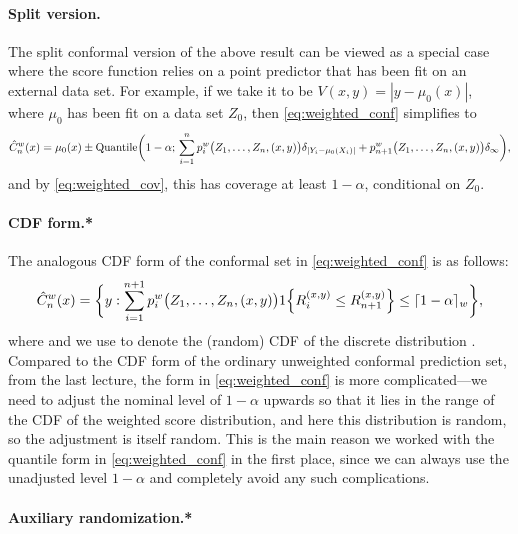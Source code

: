 \documentclass{article}
\begin{document}
\paragraph{Split version.}

The split conformal version of the above result can be viewed as a special case  
where the score function relies on a point predictor that has been fit on an
external data set. For example, if we take it to be $V(x,y) = |y-\mu_0(x)|$,
where $\mu_0$ has been fit on a data set $Z_0$, then \eqref{eq:weighted_conf} 
simplifies to       
\[
\hat{C}^w_n(x) = \mu_0(x) \pm \mathrm{Quantile}\bigg(1-\alpha; \, 
\sum_{i=1}^n p^w_i\big( Z_1,\ldots,Z_n,(x,y) \big) \delta_{|Y_i - \mu_0(X_i)|}
+ p^w_{n+1}\big( Z_1,\ldots,Z_n,(x,y) \big) \delta_\infty \bigg),
\]
and by \eqref{eq:weighted_cov}, this has coverage at least $1-\alpha$,
conditional on $Z_0$.   

\paragraph{CDF form.*}

\def\hF{\hat{F}}

The analogous CDF form of the conformal set in \eqref{eq:weighted_conf} is as
follows: 
\begin{equation}
\label{eq:weighted_cdf}
\hat{C}^w_n(x) = \bigg\{ y : \sum_{i=1}^{n+1} p^w_i\big( Z_1,\dots,Z_n,(x,y) \big) 
1\Big\{ R_i^{(x,y)} \leq R^{(x,y)}_{n+1} \Big\} \leq \lceil 1-\alpha \rceil_w
\bigg\},   
\end{equation}
where \smash{$\lceil 1-\alpha \rceil_w = \min\{ \tau \in \mathrm{range}(\hF^w_n)
  : \tau \geq 1-\alpha\}$} and we use \smash{$\hF^w_n$} to denote the (random)
CDF of the discrete distribution . 
Compared to the CDF form of the ordinary unweighted conformal prediction set,
from the last lecture, the form in \eqref{eq:weighted_conf} is more
complicated---we need to adjust the nominal level of $1-\alpha$ upwards so that
it lies in the range of the CDF of the weighted score distribution, and here
this distribution is random, so the adjustment is itself random. This is the
main reason we worked with the quantile form in \eqref{eq:weighted_conf} in the
first place, since we can always use the unadjusted level $1-\alpha$ and
completely avoid any such complications.

\paragraph{Auxiliary randomization.*}
\end{document}
